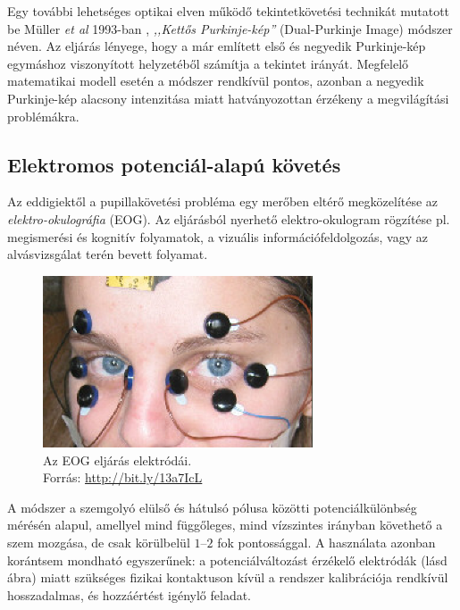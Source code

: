 Egy további lehetséges optikai elven működő tekintetkövetési technikát mutatott be Müller \emph{et al} 1993-ban \cite{muller}, \emph{,,Kettős Purkinje-kép''} (Dual-Purkinje Image) módszer néven. Az eljárás lényege, hogy a már említett első és negyedik Purkinje-kép egymáshoz viszonyított helyzetéből számítja a tekintet irányát. Megfelelő matematikai modell esetén a módszer rendkívül pontos, azonban a negyedik Purkinje-kép alacsony intenzitása miatt hatványozottan érzékeny a megvilágítási problémákra.

\subsection{Elektromos potenciál-alapú követés}\label{sect:potencial}

Az eddigiektől a pupillakövetési probléma egy merőben eltérő megközelítése az \emph{elektro-okulográfia} (EOG). Az eljárásból nyerhető elektro-okulogram rögzítése pl. megismerési és kognitív folyamatok, a vizuális információfeldolgozás, vagy az alvásvizsgálat terén bevett folyamat.

\begin{figure}[!ht]
\centering
\includegraphics[width=80mm, keepaspectratio]{figures/eog.png}
\caption{Az EOG eljárás elektródái.\\Forrás: \url{http://bit.ly/13a7IcL}}
\label{fig:eog}
\end{figure}

A módszer a szemgolyó elülső és hátulsó pólusa közötti potenciálkülönbség mérésén alapul, amellyel mind függőleges, mind vízszintes irányban követhető a szem mozgása, de csak körülbelül $1$--$2$ fok pontossággal. A használata azonban korántsem mondható egyszerűnek: a potenciálváltozást érzékelő elektródák (lásd  ábra) miatt szükséges fizikai kontaktuson kívül a rendszer kalibrációja rendkívül hosszadalmas, és hozzáértést igénylő feladat.

